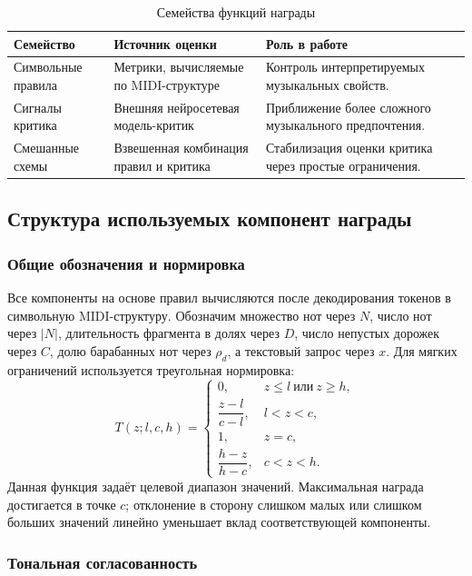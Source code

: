 \documentclass[a4paper,12pt]{extarticle}
\begin{document}
\begin{table}[ht]
\centering
\caption{Семейства функций награды}
\label{tab:reward_families}
\begin{tabular}{p{}p{}p{}}
\toprule
Семейство & Источник оценки & Роль в работе \\
\midrule
Символьные правила & Метрики, вычисляемые по MIDI-структуре & Контроль интерпретируемых музыкальных свойств. \\
Сигналы критика & Внешняя нейросетевая модель-критик & Приближение более сложного музыкального предпочтения. \\
Смешанные схемы & Взвешенная комбинация правил и критика & Стабилизация оценки критика через простые ограничения. \\
\bottomrule
\end{tabular}
\end{table}

\subsection{Структура используемых компонент награды}

\subsubsection{Общие обозначения и нормировка}

Все компоненты на основе правил вычисляются после декодирования токенов в
символьную MIDI-структуру. Обозначим множество нот через $N$, число нот
через $|N|$, длительность фрагмента в долях через $D$, число непустых
дорожек через $C$, долю барабанных нот через $\rho_d$, а текстовый
запрос через $x$. Для мягких ограничений используется треугольная
нормировка:
\[
T(z;l,c,h)=
\begin{cases}
0, & z\le l \ \text{или}\ z\ge h,\\
\dfrac{z-l}{c-l}, & l<z<c,\\
1, & z=c,\\
\dfrac{h-z}{h-c}, & c<z<h.
\end{cases}
\]
Данная функция задаёт целевой диапазон значений. Максимальная награда
достигается в точке $c$; отклонение в сторону слишком малых или слишком
больших значений линейно уменьшает вклад соответствующей компоненты.

\subsubsection{Тональная согласованность}
\end{document}
